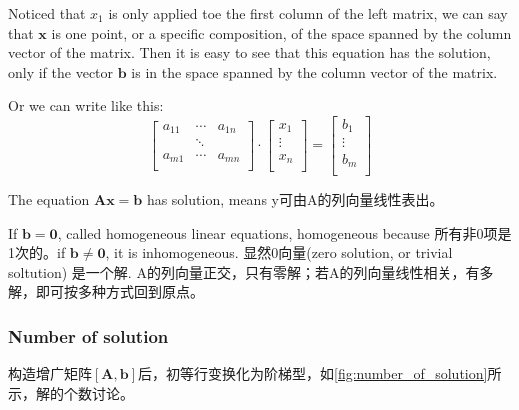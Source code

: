 \documentclass[UTF8]{../09-Mathematics}
\begin{document}
Noticed that $x_1$ is only applied toe the first column of the left matrix, we can say that $ \boldsymbol x$ is one point, or a specific composition, of the space spanned by the column vector of the matrix. Then it is easy to see that this equation has the solution, only if the vector $ \boldsymbol b$ is in the space spanned by the column vector of the matrix.


Or we can write like this:
\begin{equation}
  \begin{bmatrix}
     a_{11} & \cdots & a_{1n}\\
     & \ddots & \\
     a_{m1} & \cdots & a_{mn} \\
  \end{bmatrix}
  \cdot
  \begin{bmatrix}
    x_1 \\
    \vdots \\
    x_n \\
  \end{bmatrix}
  =
  \begin{bmatrix}
    b_1 \\
    \vdots \\
    b_m \\
  \end{bmatrix}
\end{equation}

The equation $\boldsymbol A \boldsymbol x = \boldsymbol b$ has solution, means y可由A的列向量线性表出。

If $\boldsymbol b = \boldsymbol 0$, called homogeneous linear equations, homogeneous because 所有非0项是1次的。if $\boldsymbol b \neq \boldsymbol 0$, it is inhomogeneous. 显然0向量(zero solution, or trivial soltution) 是一个解. A的列向量正交，只有零解；若A的列向量线性相关，有多解，即可按多种方式回到原点。

\subsubsection{Number of solution}

构造增广矩阵$[\boldsymbol A,\boldsymbol b ]$后，初等行变换化为阶梯型，如\ref{fig:number_of_solution}所示，解的个数讨论。

\begin{figure*}[h]
  \centering
  \caption{【number of solution】}\label{fig:number_of_solution}
\end{figure*}
\end{document}
